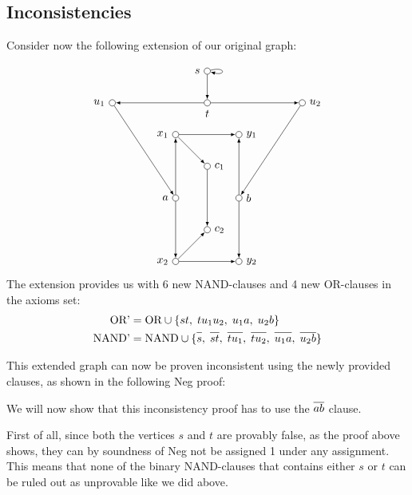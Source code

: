 \subsection{Inconsistencies}
\label{sub:Inconsistencies}
Consider now the following extension of our original graph:

\[
  \begin{tikzpicture}
    [
    point/.style={circle,draw,inner sep=0pt,minimum size=2mm},
    collection/.style={thick,rectangle,draw,inner sep=0pt,minimum height=14mm, minimum width= 9mm}
    ]
    \node (a) at (0,2) [point,label=left:$a$] {};
    \node (x1) at (0,4) [point,label=left:$x_1$] {};
    \node (x2) at (0,0) [point,label=left:$x_2$] {};
    \node (b) at (2,2) [point,label=right:$b$] {};
    \node (y1) at (2,4) [point,label=right:$y_1$] {};
    \node (y2) at (2,0) [point,label=right:$y_2$] {};
    \node (c1) at (1,3) [point,label=right:$c_1$] {};
    \node (c2) at (1,1) [point,label=right:$c_2$] {};
    \node (s) at (1,6) [point,label=left:$s$] {};
    \node (t) at (1,5) [point,label=below:$t$] {};
    \node (u1) at (-2,5) [point,label=left:$u_1$] {};
    \node (u2) at (4,5) [point,label=right:$u_2$] {};
    \draw [-latex] (a) to (x1);
    \draw [-latex] (a) to (x2);
    \draw [-latex] (b) to (y1);
    \draw [-latex] (b) to (y2);
    \draw [-latex] (x1) to (y1);
    \draw [-latex] (x1) to (c1);
    \draw [-latex] (x2) to (y2);
    \draw [-latex] (x2) to (c2);
    \draw [-latex] (c1) to (c2);
    \draw [-latex,loop right] (s) to (s);
    \draw [-latex] (s) to (t);
    \draw [-latex] (t) to (u1);
    \draw [-latex] (t) to (u2);
    \draw [-latex] (u1) to (a);
    \draw [-latex] (u2) to (b);
  \end{tikzpicture}
\]
The extension provides us with 6 new NAND-clauses and 4 new OR-clauses in the axioms set:
\begin{align}
  \text{OR'} &= \text{OR} \cup \{st,\; tu_1u_2,\; u_1a,\; u_2b \}\\
  \text{NAND'} &= \text{NAND} \cup \{\ol{s},\; \ol{st},\; \ol{tu_1},\; \ol{tu_2},\; \ol{u_1a},\; \ol{u_2b} \}
\end{align}

This extended graph can now be proven inconsistent using the newly provided clauses, as shown in the following Neg proof:
\begin{prooftree*}
  \Hypo{\dots}
\end{prooftree*}

We will now show that this inconsistency proof has to use the $\ol{ab}$ clause.

First of all, since both the vertices $s$ and $t$ are provably false, as the proof above shows, they can by soundness of Neg not be assigned 1 under any assignment.
This means that none of the binary NAND-clauses that contains either $s$ or $t$ can be ruled out as unprovable like we did above.
